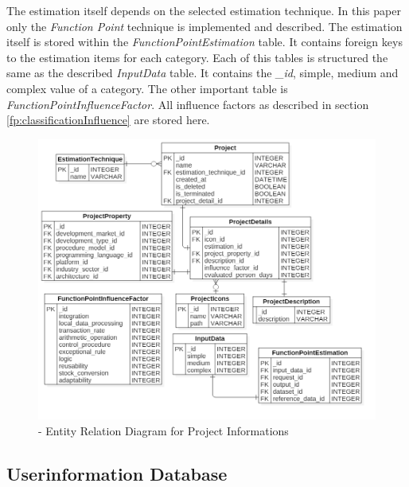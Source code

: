 The estimation itself depends on the selected estimation technique. In this paper only the \textit{Function Point} technique is implemented and described. The estimation itself is stored within the \textit{FunctionPointEstimation} table. It contains foreign keys to the estimation items for each category. Each of this tables is structured the same as the described \textit{InputData} table. It contains the \textit{\_id}, simple, medium and complex value of a category. The other important table is \textit{FunctionPointInfluenceFactor}. All influence factors as described in section \ref{fp:classificationInfluence} are stored here.
\begin{figure}[h] 
	\centering 
	\includegraphics[width=13cm]{images/projectDiagramm.png} 
	\caption{- Entity Relation Diagram  for Project Informations} 
	\label{fig:projectER}
\end{figure}

\subsection{Userinformation Database}

